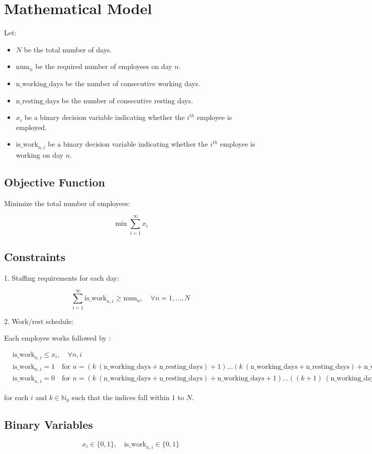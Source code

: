 \documentclass{article}
\begin{document}
\section*{Mathematical Model}

Let:
\begin{itemize}
    \item \( N \) be the total number of days.
    \item \( \text{num}_n \) be the required number of employees on day \( n \).
    \item \( \text{n\_working\_days} \) be the number of consecutive working days.
    \item \( \text{n\_resting\_days} \) be the number of consecutive resting days.
    \item \( x_i \) be a binary decision variable indicating whether the \(i^{th}\) employee is employed.
    \item \( \text{is\_work}_{n,i} \) be a binary decision variable indicating whether the \(i^{th}\) employee is working on day \(n\).
\end{itemize}

\subsection*{Objective Function}

Minimize the total number of employees:

\[
\min \sum_{i=1}^{\infty} x_i
\]

\subsection*{Constraints}

1. Staffing requirements for each day:

\[
\sum_{i=1}^{\infty} \text{is\_work}_{n,i} \geq \text{num}_n, \quad \forall n = 1, \ldots, N
\]

2. Work/rest schedule:

Each employee works  followed by :

\[
\begin{aligned}
    &\text{is\_work}_{n,i} \leq x_i, \quad \forall n, i \\
    &\text{is\_work}_{n,i} = 1 \quad \text{for } n = (k\ (\text{n\_working\_days} + \text{n\_resting\_days}) + 1) \ldots (k\ (\text{n\_working\_days} + \text{n\_resting\_days}) + \text{n\_working\_days}) \\
    &\text{is\_work}_{n,i} = 0 \quad \text{for } n = (k\ (\text{n\_working\_days} + \text{n\_resting\_days}) + \text{n\_working\_days} + 1) \ldots ((k+1)\ (\text{n\_working\_days} + \text{n\_resting\_days}))
\end{aligned}
\]

for each \( i \) and \( k \in \mathbb{N}_0 \) such that the indices fall within \(1\) to \(N\).

\subsection*{Binary Variables}

\[
x_i \in \{0, 1\}, \quad \text{is\_work}_{n,i} \in \{0, 1\}
\]
\end{document}
